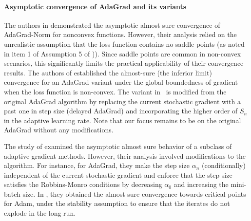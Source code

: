 \documentclass[standalone]{article}
\begin{document}
\paragraph{\textbf{Asymptotic convergence of AdaGrad and its variants}} The authors in \cite{jin2022convergence} demonstrated the asymptotic almost sure convergence of AdaGrad-Norm for nonconvex functions. However, their analysis relied on the unrealistic assumption that the loss function contains no saddle points (as noted in item 1 of Assumption 5 of \cite{jin2022convergence})). Since saddle points are common in non-convex scenarios, this significantly limits the practical applicability of their convergence results.
The authors of \cite{li2019convergence} established the almost-sure (the inferior limit) convergence for an AdaGrad variant under the global boundedness of gradient when the loss function is non-convex. The variant in~\cite{li2019convergence} is modified from the original AdaGrad algorithm by replacing the current stochastic gradient with a past one in step size (delayed AdaGrad) and incorporating the higher order of $S_n$ in the adaptive learning rate.  %
Note that our focus remains to be on the original AdaGrad without any modifications. 

The study of \cite{gadat2022asymptotic} examined the asymptotic almost sure behavior of a subclass of adaptive gradient methods. However, their analysis involved modifications to the algorithm. For instance, for AdaGrad, they make the step size $\alpha_n$ (conditionally) independent of the current stochastic gradient and enforce that the step size satisfies the Robbins-Monro conditions by decreasing $\alpha_0$ and increasing the mini-batch size.  In \cite{barakat2021convergence}, they obtained the almost sure convergence towards critical points for Adam, under the stability assumption to ensure that the iterates do not explode in the long run.
\end{document}
